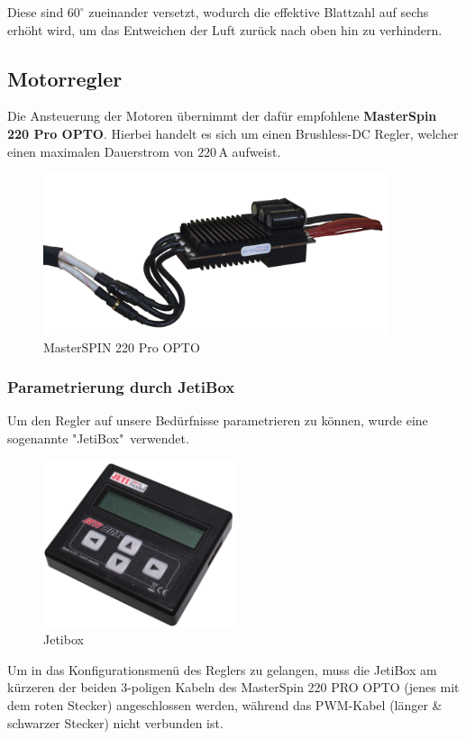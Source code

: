 Diese sind $60^\circ$ zueinander versetzt, wodurch die effektive Blattzahl auf sechs erhöht wird, 
um das Entweichen der Luft zurück nach oben hin zu verhindern.


\newpage

\subsection{Motorregler}
Die Ansteuerung der Motoren übernimmt der dafür empfohlene \textbf{MasterSpin 220 Pro OPTO}.
Hierbei handelt es sich um einen Brushless-DC Regler, welcher einen maximalen Dauerstrom von $220\,\mathrm{A}$ aufweist.
\begin{figure}[h]
    \centering
    \includegraphics[width=0.9\textwidth]{Fotos/MasterSpin_ohne_Halter.png}
    \caption{MasterSPIN 220 Pro OPTO}
\end{figure}
\subsubsection*{Parametrierung durch JetiBox}
Um den Regler auf unsere Bedürfnisse parametrieren zu können, wurde eine sogenannte "JetiBox"\ verwendet.
\begin{figure}[h]
    \centering
    \includegraphics[width=0.5\textwidth]{Fotos/JetiBox.png}
    \caption{Jetibox}
\end{figure}
\newpage
Um in das Konfigurationsmenü des Reglers zu gelangen, muss die JetiBox am kürzeren der beiden 3-poligen Kabeln des MasterSpin 220 PRO OPTO (jenes mit dem roten Stecker) angeschlossen werden, 
während das PWM-Kabel (länger \& schwarzer Stecker) nicht verbunden ist.\\

